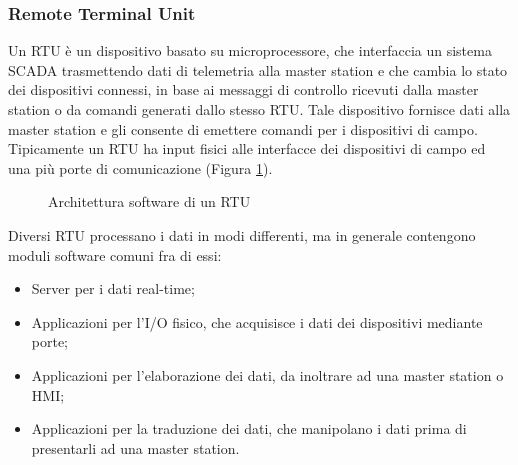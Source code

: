 \subsubsection{Remote Terminal Unit \label{sssec:RTU}}
Un RTU è un dispositivo basato su microprocessore, che interfaccia un sistema SCADA trasmettendo dati di telemetria alla master station e che cambia lo stato dei dispositivi connessi, in base ai messaggi di controllo ricevuti dalla master station o da comandi generati dallo stesso RTU. Tale dispositivo fornisce dati alla master station e gli consente di emettere comandi per i dispositivi di campo. Tipicamente un RTU ha input fisici alle interfacce dei dispositivi di campo ed una più porte di comunicazione (Figura \ref{fig:26}).

\begin{figure}[h] 
\caption{Architettura software di un RTU}\label{fig:26}
\end{figure}

Diversi RTU processano i dati in modi differenti, ma in generale contengono moduli software comuni fra di essi:
\begin{itemize}
	\item Server per i dati real-time;
	\item Applicazioni per l'I/O fisico, che acquisisce i dati dei dispositivi mediante porte;
	\item Applicazioni per l'elaborazione dei dati, da inoltrare ad una master station o HMI;
	\item Applicazioni per la traduzione dei dati, che manipolano i dati prima di presentarli ad una master station.
\end{itemize}

